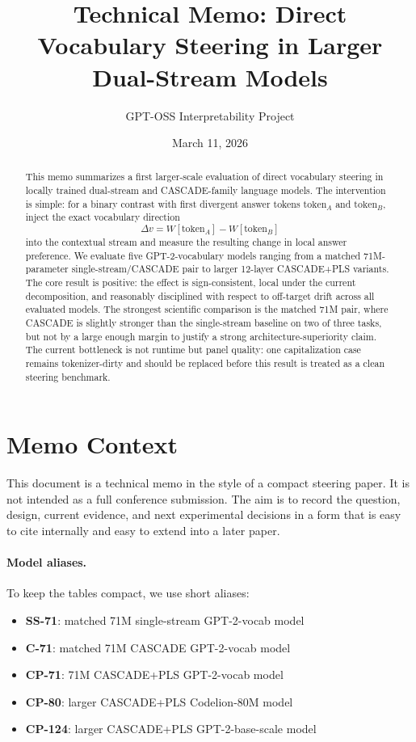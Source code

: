 \documentclass[11pt]{article}
\title{Technical Memo: Direct Vocabulary Steering in Larger Dual-Stream Models}
\author{GPT-OSS Interpretability Project}
\date{March 11, 2026}
\begin{document}
\maketitle

\begin{abstract}
This memo summarizes a first larger-scale evaluation of direct vocabulary
steering in locally trained dual-stream and CASCADE-family language models.
The intervention is simple: for a binary contrast with first divergent answer
tokens $\text{token}_A$ and $\text{token}_B$, inject the exact vocabulary
direction
\[
\Delta v = W[\text{token}_A] - W[\text{token}_B]
\]
into the contextual stream and measure the resulting change in local answer
preference. We evaluate five GPT-2-vocabulary models ranging from a matched
71M-parameter single-stream/CASCADE pair to larger 12-layer CASCADE+PLS
variants. The core result is positive: the effect is sign-consistent, local
under the current decomposition, and reasonably disciplined with respect to
off-target drift across all evaluated models. The strongest scientific
comparison is the matched 71M pair, where CASCADE is slightly stronger than the
single-stream baseline on two of three tasks, but not by a large enough margin
to justify a strong architecture-superiority claim. The current bottleneck is
not runtime but panel quality: one capitalization case remains tokenizer-dirty
and should be replaced before this result is treated as a clean steering
benchmark.
\end{abstract}

\section{Memo Context}

This document is a technical memo in the style of a compact steering paper. It
is not intended as a full conference submission. The aim is to record the
question, design, current evidence, and next experimental decisions in a form
that is easy to cite internally and easy to extend into a later paper.

\paragraph{Model aliases.}
To keep the tables compact, we use short aliases:
\begin{itemize}[leftmargin=1.5em]
\item \textbf{SS-71}: matched 71M single-stream GPT-2-vocab model
\item \textbf{C-71}: matched 71M CASCADE GPT-2-vocab model
\item \textbf{CP-71}: 71M CASCADE+PLS GPT-2-vocab model
\item \textbf{CP-80}: larger CASCADE+PLS Codelion-80M model
\item \textbf{CP-124}: larger CASCADE+PLS GPT-2-base-scale model
\end{itemize}
\end{document}
